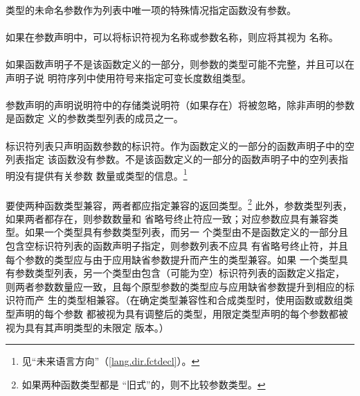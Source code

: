{\paragraph{}
类型的未命名参数作为列表中唯一项的特殊情况指定函数没有参数。

\paragraph{}
如果在参数声明中，可以将标识符视为名称或参数名称，则应将其视为
名称。

\paragraph{}
如果函数声明子不是该函数定义的一部分，则参数的类型可能不完整，并且可以在声明子说
明符序列中使用\tm{[*]}符号来指定可变长度数组类型。

\paragraph{}
参数声明的声明说明符中的存储类说明符（如果存在）将被忽略，除非声明的参数是函数定
义的参数类型列表的成员之一。

\paragraph{}
标识符列表只声明函数参数的标识符。作为函数定义的一部分的函数声明子中的空列表指定
该函数没有参数。不是该函数定义的一部分的函数声明子中的空列表指明没有提供有关参数
数量或类型的信息。\footnote{见``未来语言方向''（\ref{lang.dir.fctdecl}）。}

\paragraph{}
要使两种函数类型兼容，两者都应指定兼容的返回类型。\footnote{如果两种函数类型都是
``旧式''的，则不比较参数类型。} 此外，参数类型列表，如果两者都存在，则参数数量和
省略号终止符应一致；对应参数应具有兼容类型。如果一个类型具有参数类型列表，而另一
个类型由不是函数定义的一部分且包含空标识符列表的函数声明子指定，则参数列表不应具
有省略号终止符，并且每个参数的类型应与由于应用缺省参数提升而产生的类型兼容。如果
一个类型具有参数类型列表，另一个类型由包含（可能为空）标识符列表的函数定义指定，
则两者参数数量应一致，且每个原型参数的类型应与应用缺省参数提升到相应的标识符而产
生的类型相兼容。（在确定类型兼容性和合成类型时，使用函数或数组类型声明的每个参数
都被视为具有调整后的类型，用限定类型声明的每个参数都被视为具有其声明类型的未限定
版本。）

}
